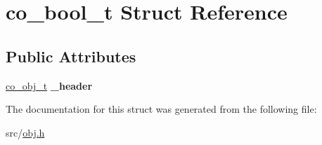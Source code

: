 \hypertarget{structco__bool__t}{\section{co\-\_\-bool\-\_\-t Struct Reference}
\label{structco__bool__t}
}
\subsection*{Public Attributes}
\begin{DoxyCompactItemize}
\item 
\hypertarget{structco__bool__t_ad8cbe3f5722f71480b9640cd8337f87e}{\hyperlink{structco__obj__t}{co\-\_\-obj\-\_\-t} {\bfseries \-\_\-header}}\label{structco__bool__t_ad8cbe3f5722f71480b9640cd8337f87e}

\end{DoxyCompactItemize}


The documentation for this struct was generated from the following file\-:\begin{DoxyCompactItemize}
\item 
src/\hyperlink{obj_8h}{obj.\-h}\end{DoxyCompactItemize}
